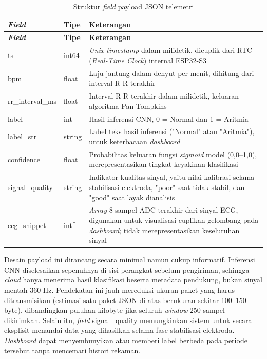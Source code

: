 \begin{center}
  \setlength{\tabcolsep}{4pt}
  \renewcommand{\arraystretch}{1.15}
  \small
  \begin{longtable}{|p{3.6cm}|p{2.0cm}|p{7.4cm}|}
    \caption{Struktur \textit{field} payload JSON telemetri}
    \label{tab:payload-json} \\
    \hline
    \rowcolor{headgray}
    \textbf{\textit{Field}} &
    \textbf{Tipe} &
    \textbf{Keterangan} \\
    \hline
    \endfirsthead
    \hline
    \rowcolor{headgray}
    \textbf{\textit{Field}} &
    \textbf{Tipe} &
    \textbf{Keterangan} \\
    \hline
    \endhead
    \hline
    \endfoot
    ts &
    int64 &
    \textit{Unix timestamp} dalam milidetik, dicuplik dari RTC
    (\textit{Real-Time Clock}) internal ESP32-S3 \\
    \hline
    bpm &
    float &
    Laju jantung dalam denyut per menit, dihitung dari interval R-R
    terakhir \\
    \hline
    rr\_interval\_ms &
    float &
    Interval R-R terakhir dalam milidetik, keluaran algoritma
    Pan-Tompkins \\
    \hline
    label &
    int &
    Hasil inferensi CNN, 0 = Normal dan 1 = Aritmia \\
    \hline
    label\_str &
    string &
    Label teks hasil inferensi ("Normal" atau
    "Aritmia"), untuk keterbacaan \textit{dashboard} \\
    \hline
    confidence &
    float &
    Probabilitas keluaran fungsi \textit{sigmoid} model (0,0--1,0),
    merepresentasikan tingkat keyakinan klasifikasi \\
    \hline
    signal\_quality &
    string &
    Indikator kualitas sinyal, yaitu nilai kalibrasi selama stabilisasi
    elektroda, "poor" saat tidak stabil, dan "good" saat layak dianalisis \\
    \hline
    ecg\_snippet &
    int[] &
    \textit{Array} 8 sampel ADC terakhir dari sinyal ECG, digunakan
    untuk visualisasi cuplikan gelombang pada \textit{dashboard};
    tidak merepresentasikan keseluruhan sinyal \\
  \end{longtable}
\end{center}

Desain payload ini dirancang secara minimal namun cukup informatif.
Inferensi CNN diselesaikan sepenuhnya di sisi perangkat sebelum
pengiriman, sehingga \textit{cloud} hanya menerima hasil klasifikasi
beserta metadata pendukung, bukan sinyal mentah 360 Hz. Pendekatan
ini jauh mereduksi ukuran paket yang harus ditransmisikan
(estimasi satu paket JSON di atas berukuran sekitar 100--150 byte),
dibandingkan puluhan kilobyte jika seluruh \textit{window} 250 sampel
dikirimkan. Selain itu, \textit{field} signal\_quality memungkinkan
sistem untuk secara eksplisit menandai data yang dihasilkan selama fase
stabilisasi elektroda. \textit{Dashboard} dapat menyembunyikan
atau memberi label berbeda pada periode tersebut tanpa mencemari
histori rekaman.

